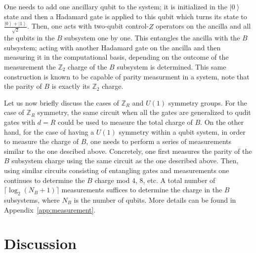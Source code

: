 \documentclass[aps,pra,reprint,superscriptaddress,twocolumn,notitlepage]{revtex4-1}
\newcommand{\Z}{\mathbb{Z}}
\numberwithin{equation}{section}
\begin{document}
One needs to add one ancillary qubit to the system; it is initialized in the $\left|0\right\rangle$ state and then a Hadamard gate is applied to this qubit which turns its state to $\frac{\left|0\right\rangle + \left|1\right\rangle}{\sqrt{2}}$. Then, one acts with two-qubit control-$Z$ operators on the ancilla and all the qubits in the $B$ subsystem one by one. This entangles the ancilla with the $B$ subsystem; acting with another Hadamard gate on the ancilla and then measuring it in the computational basis, depending on the outcome of the measurement the $\Z_2$ charge of the $B$ subsystem is determined. This same construction is known to be capable of parity measurment in a system, note that the parity of $B$ is exactly its $\Z_2$ charge.

Let us now briefly discuss the cases of $\mathbb{Z}_R$ and $U(1)$ symmetry groups. For the case of $\mathbb{Z}_R$ symmetry, the same circuit when all the gates are generalized to qudit gates with $d=R$ could be used to measure the total charge of $B$. On the other hand, for the case of having a $U(1)$ symmetry within a qubit system, in order to measure the charge of $B$, one needs to perform a series of measurements similar to the one descibed above. Concretely, one first measures the parity of the $B$ subsystem charge using the same circuit as the one described above. Then, using similar circuits consisting of entangling gates and measurements one continues to determine the $B$ charge mod $4$, $8$, etc. A total number of $\lceil \log_2 (N_B + 1) \rceil$ measurements suffices to determine the charge in the $B$ subsystems, where $N_B$ is the number of qubits.
More details can be found in Appendix~\ref{app:measurement}.

\section{Discussion}
\label{sec:discussion}
\end{document}
